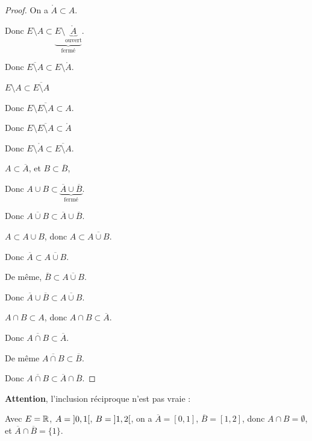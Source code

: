 \begin{proof}
    On a $\mathring A \subset A$. 

    Donc $E \setminus A \subset \underbrace{E \setminus \underbrace{\mathring A}_{\text{ouvert}}}_{\text{fermé}}$.

    Donc $\overline{E \setminus A} \subset E \setminus \mathring A$.



    \svspace $E \setminus A \subset \overline{E \setminus A}$

    Donc $E \setminus \overline{E \setminus A} \subset A$.

    Donc $E \setminus \overline{E \setminus A} \subset \mathring A$ 

    Donc $E \setminus \mathring A \subset \overline{E \setminus A}$. 


    \svspace $A \subset \overline A$, et $B \subset \overline B$,

    Donc $A \cup B \subset \underbrace{\overline A \cup \overline B}_{\text{fermé}}$.

    Donc $\overline{A \cup B} \subset \overline A \cup \overline B$.



    \svspace $A \subset A \cup B$, donc $A \subset \overline{A \cup B}$.

    Donc $\overline A \subset \overline{A \cup B}$.

    De même, $\overline B \subset \overline{A \cup B}$.

    Donc $\overline A \cup \overline B \subset \overline{A \cup B}$.


    $A \cap B \subset A$, donc $A \cap B \subset \overline A$. 

    Donc $\overline {A \cap B} \subset \overline A$.

    De même $\overline {A \cap B} \subset \overline B$.

    Donc $\overline {A \cap B} \subset \overline A \cap \overline B$.
\end{proof}

\textbf{Attention}, l'inclusion réciproque n'est pas vraie : 

Avec $E = \mathbb{R}$, $A = \left]0, 1\right[$, $B = \left]1, 2\right[$, on a 
$\overline A = [0, 1]$, $\overline B = [1, 2]$, donc $A \cap B = \emptyset$, et 
$\overline A \cap \overline B = \{1\}$.

